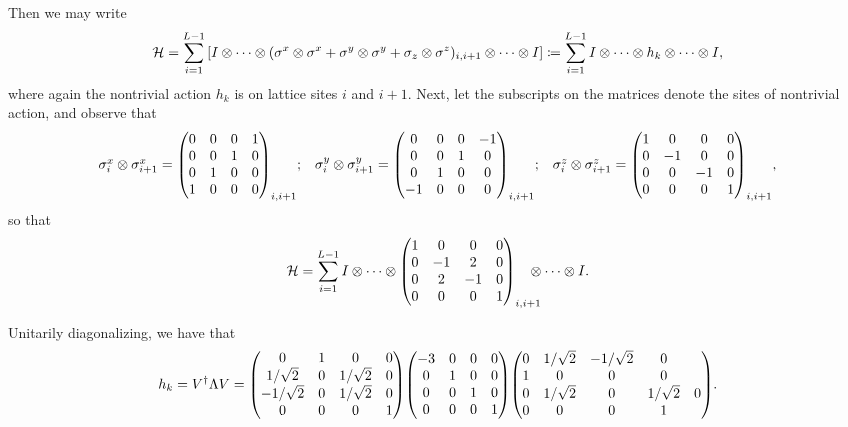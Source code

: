 \documentclass[10pt]{amsart}
\theoremstyle{definition}
\newcommand{\Sum}{\ensuremath{\displaystyle\sum}}          %
\newcommand{\tens}{\ensuremath{\otimes}}                   %
\newcommand{\Ham}{\ensuremath{\mathcal{H}}}                %
\begin{document}
Then we may write
\[
  \Ham = \Sum_{i=1}^{L-1} \qty[I \tens \cdots \tens (\sigma^x \tens \sigma^x
      + \sigma^y \tens \sigma^y + \sigma_z \tens \sigma^z)_{i,i+1} \tens \cdots 
      \tens I]
    \coloneqq \Sum_{i=1}^{L-1} I \tens \cdots \tens h_k \tens \cdots \tens I,
\]
where again the nontrivial action $h_k$ is on lattice sites $i$ and $i+1$. Next,
let the subscripts on the matrices denote the sites of nontrivial action, and
observe that
\[ \mqty{ 
  \sigma^x_i \tens \sigma^x_{i+1} = \mqty(0 & 0 & 0 & 1 \\ 0 & 0 & 1 & 0 \\ 
                                  0 & 1 & 0 & 0 \\ 1 & 0 & 0 & 0)_{i,i+1}; &
  \sigma^y_i \tens \sigma^y_{i+1} = \mqty(0 & 0 & 0 & -1 \\ 0 & 0 & 1 & 0 \\
                                  0 & 1 & 0 & 0 \\ -1 & 0 & 0 & 0)_{i,i+1}; &
  \sigma^z_i \tens \sigma^z_{i+1} = \mqty(1 & 0 & 0 & 0 \\ 0 & -1 & 0 & 0 \\
                                  0 & 0 & -1 & 0 \\ 0 & 0 & 0 & 1)_{i,i+1},
} \] 
so that
\[
  \Ham = \Sum_{i=1}^{L-1} I \tens \cdots \tens 
      \mqty(1 & 0 & 0 & 0 \\ 0 & -1 & 2 & 0 \\
            0 & 2 & -1 & 0 \\ 0 & 0 & 0 & 1)_{i,i+1} \hspace*{-1em} \tens 
      \cdots \tens I.
\]

Unitarily diagonalizing, we have that
\[
  h_k = V^\dagger \Lambda V 
      = \mqty(0 & 1 & 0 & 0 \\ 1/\sqrt{2} & 0 & 1/\sqrt{2} & 0 \\
              -1/\sqrt{2} & 0 & 1/\sqrt{2} & 0 \\ 0 & 0 & 0 & 1)
        \mqty(-3 & 0 & 0 & 0 \\ 0 & 1 & 0 & 0 \\ 
              0 & 0 & 1 & 0 \\ 0 & 0 & 0 & 1)
        \mqty(0 & 1/\sqrt{2} & -1/\sqrt{2} & 0 \\ 1 & 0 & 0 & 0 \\
              0 & 1/\sqrt{2} & 0 & 1/\sqrt{2} & 0 \\ 0 & 0 & 0 & 1).
\]
\end{document}
